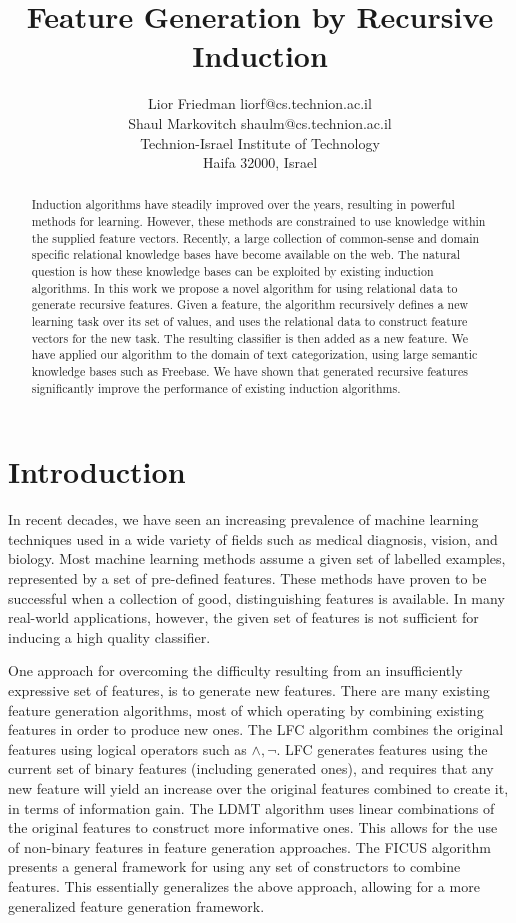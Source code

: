 \documentclass[twoside,11pt]{article}
\title{Feature Generation by Recursive Induction}
\author{\name Lior Friedman \email liorf@cs.technion.ac.il \\
	\name Shaul Markovitch \email shaulm@cs.technion.ac.il \\
	\addr Technion-Israel Institute of Technology\\
	Haifa 32000, Israel
	}
\theoremstyle{definition}
\begin{document}
\maketitle

\begin{abstract}
  Induction algorithms have steadily improved over the years, resulting in powerful methods for learning. However, these methods are constrained to use knowledge within the supplied feature vectors. Recently, a large collection of common-sense and domain specific relational knowledge bases have become available on the web. The natural question is how these knowledge bases can be exploited by existing induction algorithms.
  In this work we propose a novel algorithm for using relational data to generate recursive features. Given a feature, the algorithm recursively defines a new learning task over its set of values, and uses the relational data to construct feature vectors for the new task. The resulting classifier is then added as a new feature.
  We have applied our algorithm to the domain of text categorization, using large semantic knowledge bases such as Freebase. We have shown that generated recursive features significantly improve the performance of existing induction algorithms.
\end{abstract}

\section{Introduction}
\label{sec:Intro}
In recent decades, we have seen an increasing prevalence of machine learning techniques used in a wide variety of fields such as medical diagnosis, vision, and biology.
Most machine learning methods assume a given set of labelled examples, represented by a set of
pre-defined features. These methods have proven to be successful when a collection of good,
distinguishing features is available.
In many real-world applications, however, the given set of features is not sufficient for inducing a high quality classifier.

One approach for overcoming the difficulty resulting from an insufficiently expressive set of features, is to generate new features. There are many existing feature generation algorithms, most of which operating by combining existing features in order to produce new ones. The LFC algorithm \cite{ragavan1993complex} combines the original features using logical operators such as $\land ,\lnot$. LFC generates features using the current set of binary features (including generated ones), and requires that any new feature will yield an increase over the original features combined to create it, in terms of information gain.
The LDMT algorithm \cite{utgo1991linear} uses linear combinations of the original features to construct more informative ones. This allows for the use of non-binary features in feature generation approaches.
The FICUS algorithm \cite{markovitch2002feature} presents a general framework for using any set of constructors to combine features. This essentially generalizes the above approach, allowing for a more generalized feature generation framework.
\end{document}
